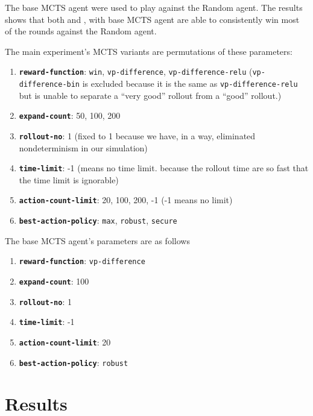 The base MCTS agent were used to play against the Random agent. The results shows that both \Marquise{} and \Eyrie{}, with base MCTS agent are able to consistently win most of the rounds against the Random agent.

The main experiment's MCTS variants are permutations of these parameters:
\begin{enumerate}
    \item \textbf{\texttt{reward-function}}: \texttt{win}, \texttt{vp-difference}, \texttt{vp-difference-relu} (\texttt{vp-difference-bin} is excluded because it is the same as \texttt{vp-difference-relu} but is unable to separate a ``very good'' rollout from a ``good'' rollout.)
    \item \textbf{\texttt{expand-count}}: 50, 100, 200
    \item \textbf{\texttt{rollout-no}}: 1 (fixed to 1 because we have, in a way, eliminated nondeterminism in our simulation)
    \item \textbf{\texttt{time-limit}}: -1 (means no time limit. because the rollout time are so fast that the time limit is ignorable)
    \item \textbf{\texttt{action-count-limit}}: 20, 100, 200, -1 (-1 means no limit)
    \item \textbf{\texttt{best-action-policy}}: \texttt{max}, \texttt{robust}, \texttt{secure}
\end{enumerate}

The base MCTS agent's parameters are as follows
\begin{enumerate}
    \item \textbf{\texttt{reward-function}}: \texttt{vp-difference}
    \item \textbf{\texttt{expand-count}}: 100
    \item \textbf{\texttt{rollout-no}}: 1
    \item \textbf{\texttt{time-limit}}: -1
    \item \textbf{\texttt{action-count-limit}}: 20
    \item \textbf{\texttt{best-action-policy}}: \texttt{robust}
\end{enumerate}


\section{Results}

